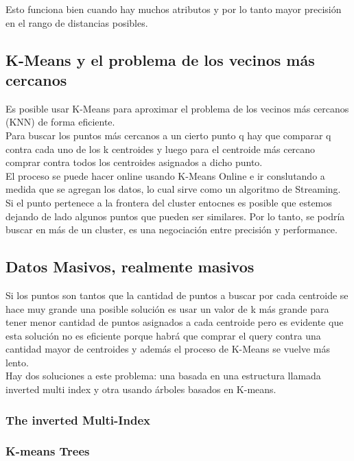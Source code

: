 \documentclass[titlepage,a4paper]{article}
\begin{document}
Esto funciona bien cuando hay muchos atributos y por lo tanto mayor precisión en el rango de distancias posibles. 

\subsection*{K-Means y el problema de los vecinos más cercanos}
Es posible usar K-Means para aproximar el problema de los vecinos más cercanos (KNN) de forma eficiente.\\

Para buscar los puntos más cercanos a un cierto punto q hay que comparar q contra cada uno de los k centroides y luego para el centroide más cercano comprar contra todos los centroides asignados a dicho punto.\\

El proceso se puede hacer online usando K-Means Online e ir conslutando a medida que se agregan los datos, lo cual sirve como un algoritmo de Streaming. \\

Si el punto pertenece a la frontera del cluster entocnes es posible que estemos dejando de lado algunos puntos que pueden ser similares.  Por lo tanto, se podría buscar en más de un cluster, es una negociación entre precisión y performance. \\

\subsection*{Datos Masivos, realmente masivos}
Si los puntos son tantos que la cantidad de puntos a buscar por cada centroide se hace muy grande una posible solución es usar un valor de k más grande para tener menor cantidad de puntos asignados a cada centroide pero es evidente que esta solución no es eficiente porque habrá que comprar el query contra una cantidad mayor de centroides y además el proceso de K-Means se vuelve más lento. \\

Hay dos soluciones a este problema: una basada en una estructura llamada inverted multi index y otra usando árboles basados en K-means. 

\subsubsection*{The inverted Multi-Index}
\subsubsection*{K-means Trees}
\end{document}
